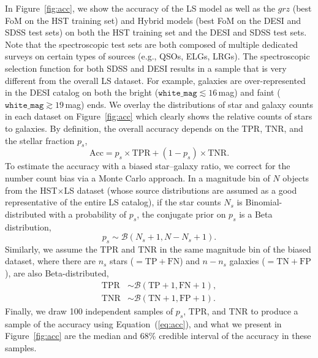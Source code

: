\documentclass[twocolumn]{aastex631}
\begin{document}
\begin{CJK*}{UTF8}{gbsn}
In Figure~\ref{fig:acc}, we show the accuracy of the LS model as well as the $grz$ (best FoM on the HST training set) and Hybrid models (best FoM on the DESI and SDSS test sets) on both the HST training set and the DESI and SDSS test sets. Note that the spectroscopic test sets are both composed of multiple dedicated surveys on certain types of sources (e.g., QSOs, ELGs, LRGs). The spectroscopic selection function for both SDSS and DESI results in a sample that is very different from the overall LS dataset. For example, galaxies are over-represented in the DESI catalog on both the bright ($\texttt{white\_mag}\lesssim16$\,mag) and faint ($\texttt{white\_mag}\gtrsim19$\,mag) ends.
We overlay the distributions of star and galaxy counts in each dataset on Figure~\ref{fig:acc} which clearly shows the relative counts of stars to galaxies. By definition, the overall accuracy depends on the TPR, TNR, and the stellar fraction $p_s$,
\begin{equation}\label{eq:acc}
    \mathrm{Acc} = p_s\times\mathrm{TPR} + (1-p_s)\times\mathrm{TNR}.
\end{equation}
To estimate the accuracy with a biased star--galaxy ratio, we correct for the number count bias via a Monte Carlo approach. In a magnitude bin of $N$ objects from the HST$\times$LS dataset (whose source distributions are assumed as a good representative of the entire LS catalog), if the star counts $N_s$ is Binomial-distributed with a probability of $p_s$, the conjugate prior on $p_s$ is a Beta distribution, 
\begin{equation*}
    p_s\sim\mathcal{B}(N_s+1, N-N_s+1).
\end{equation*}
Similarly, we assume the TPR and TNR in the same magnitude bin of the biased dataset, where there are $n_s$ stars ($=$$\mathrm{TP+FN}$) and $n-n_s$ galaxies ($=$$\mathrm{TN+FP}$), are also Beta-distributed,
\begin{equation*}
    \begin{aligned}
        \mathrm{TPR}&\sim\mathcal{B}(\mathrm{TP}+1, \mathrm{FN}+1),\\
        \mathrm{TNR}&\sim\mathcal{B}(\mathrm{TN}+1, \mathrm{FP}+1).
    \end{aligned}
\end{equation*}
Finally, we draw 100 independent samples of $p_s$, TPR, and TNR to produce a sample of the accuracy using Equation~(\ref{eq:acc}), and what we present in Figure~\ref{fig:acc} are the median and 68\% credible interval of the accuracy in these samples.


\end{CJK*}
\end{document}
